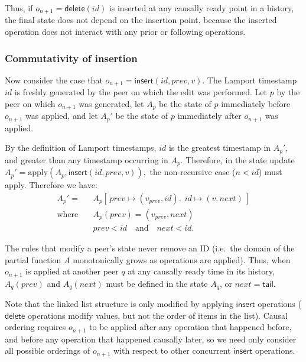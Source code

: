 \documentclass[a4paper,twocolumn,10pt]{article}
\begin{document}
Thus, if $o_{n+1}=\mathsf{delete}(\mathit{id})$ is inserted at any causally ready point in a history, the final state does not depend on the insertion point, because the inserted operation does not interact with any prior or following operations.

\subsubsection{Commutativity of insertion}

Now consider the case that $o_{n+1}=\mathsf{insert}(\mathit{id}, \mathit{prev}, v)$. The Lamport timestamp $\mathit{id}$ is freshly generated by the peer on which the edit was performed. Let $p$ by the peer on which $o_{n+1}$ was generated, let $A_p$ be the state of $p$ immediately before $o_{n+1}$ was applied, and let $A_p'$ be the state of $p$ immediately after $o_{n+1}$ was applied.

By the definition of Lamport timestamps, $\mathit{id}$ is the greatest timestamp in $A_p'$, and greater than any timestamp occurring in $A_p$. Therefore, in the state update $A_p' = \mathrm{apply}(A_p, \mathsf{insert}(\mathit{id}, \mathit{prev}, v)),$ the non-recursive case ($n < \mathit{id}$) must apply. Therefore we have:
\begin{align*}
A_p' =\; & A_p[\,\mathit{prev} \mapsto (v_\mathit{prev}, \mathit{id}),\; \mathit{id} \mapsto (v, \mathit{next})\,] \\
\text{where}\quad & A_p(\mathit{prev}) = (v_\mathit{prev}, \mathit{next}) \\
& \mathit{prev} < \mathit{id} \quad\text{and}\quad \mathit{next} < \mathit{id}.
\end{align*}

The rules that modify a peer's state never remove an ID (i.e.\ the domain of the partial function $A$ monotonically grows as operations are applied). Thus, when $o_{n+1}$ is applied at another peer $q$ at any causally ready time in its history, $A_q(\mathit{prev})$ and $A_q(\mathit{next})$ must be defined in the state $A_q$, or $\mathit{next} = \mathsf{tail}$.

Note that the linked list structure is only modified by applying $\mathsf{insert}$ operations ($\mathsf{delete}$ operations modify values, but not the order of items in the list). Causal ordering requires $o_{n+1}$ to be applied after any operation that happened before, and before any operation that happened causally later, so we need only consider all possible orderings of $o_{n+1}$ with respect to other concurrent $\mathsf{insert}$ operations.
\end{document}
